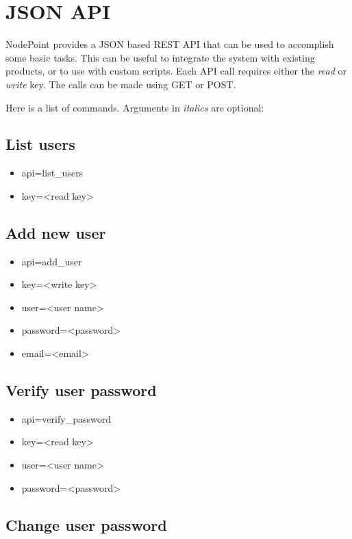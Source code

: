 \documentclass[11pt]{article}
\begin{document}
\clearpage
\section{JSON API}
NodePoint provides a JSON based REST API that can be used to accomplish some basic tasks. This can be useful to integrate the system with existing products, or to use with custom scripts. Each API call requires either the \textit{read} or \textit{write} key. The calls can be made using GET or POST.

Here is a list of commands. Arguments in \textit{italics} are optional:

\subsection{List users}

\begin{itemize}
\item api=list\_users
\item key=<read key>
\end{itemize}

\subsection{Add new user}

\begin{itemize}
\item api=add\_user
\item key=<write key>
\item user=<user name>
\item password=<password>
\item email=<email>
\end{itemize}

\subsection{Verify user password}

\begin{itemize}
\item api=verify\_password
\item key=<read key>
\item user=<user name>
\item password=<password>
\end{itemize}

\subsection{Change user password}
\end{document}
